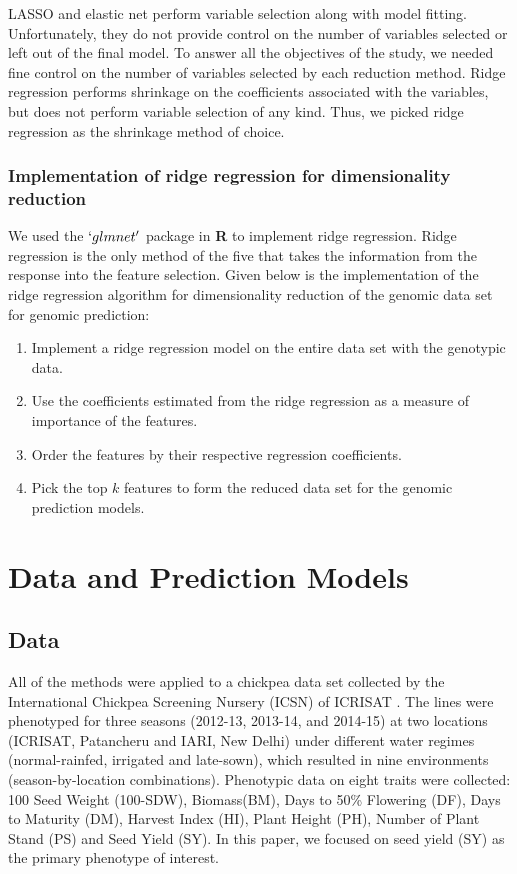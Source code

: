 LASSO and elastic net perform variable selection along with model fitting. Unfortunately, they do not provide control on the number of variables selected or left out of the final model. To answer all the objectives of the study, we needed fine control on the number of variables selected by each reduction method. Ridge regression performs shrinkage on the coefficients associated with the variables, but does not perform variable selection of any kind. Thus, we picked ridge regression as the shrinkage method of choice. 

\subsubsection{Implementation of ridge regression for dimensionality reduction}

We used the $`glmnet'$ \cite{glmnet} package in \textbf{R} to implement ridge regression. Ridge regression is the only method of the five that takes the information from the response into the feature selection. Given below is the implementation of the ridge regression algorithm for dimensionality reduction of the genomic data set for genomic prediction:

\begin{enumerate}
    \item Implement a ridge regression model on the entire data set with the genotypic data.
    \item Use the coefficients estimated from the ridge regression as a measure of importance of the features. 
    \item Order the features by their respective regression coefficients.
    \item Pick the top $k$ features to form the reduced data set for the genomic prediction models. 
\end{enumerate}

\section{Data and Prediction Models}
\label{sec:gp and data}
\subsection{Data}

All of the methods were applied to a chickpea data set collected by the International Chickpea Screening Nursery (ICSN) of ICRISAT \cite{roorkiwal_genome-enabled_2016}.  The lines were phenotyped for three seasons (2012-13, 2013-14, and 2014-15) at two locations (ICRISAT, Patancheru and IARI, New Delhi) under different water regimes (normal-rainfed, irrigated and late-sown), which resulted in nine environments (season-by-location combinations). Phenotypic data on eight traits were collected: 100 Seed Weight (100-SDW), Biomass(BM), Days to 50\% Flowering (DF), Days to Maturity (DM), Harvest Index (HI), Plant Height (PH), Number of Plant Stand (PS) and Seed Yield (SY). In this paper, we focused on seed yield (SY) as the primary phenotype of interest. \\

